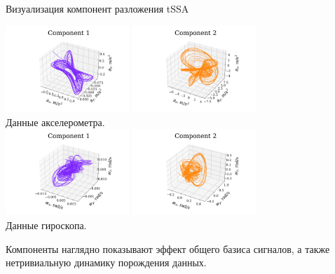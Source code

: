 \documentclass[10pt]{beamer}
\theoremstyle{definition}
\begin{document}
	\begin{frame}{Визуализация компонент разложения tSSA}
		
		\begin{center}
			\includegraphics[width=0.35\textwidth, keepaspectratio]{../../experiments/motion_1/tssa/figs/decomposition/cpd_rank_15/acceler_1.png}
			\includegraphics[width=0.35\textwidth, keepaspectratio]{../../experiments/motion_1/tssa/figs/decomposition/cpd_rank_15/acceler_2.png} \\
			{\small Данные акселерометра.} \\
			\includegraphics[width=0.35\textwidth, keepaspectratio]{../../experiments/motion_1/tssa/figs/decomposition/cpd_rank_15/gyro_1.png}
			\includegraphics[width=0.35\textwidth, keepaspectratio]{../../experiments/motion_1/tssa/figs/decomposition/cpd_rank_15/gyro_2.png} \\
			{\small Данные гироскопа.} \\
		\end{center}
		
		Компоненты наглядно показывают эффект общего базиса сигналов, а также нетривиальную динамику порождения данных.
		
	\end{frame}
	
\end{document}
